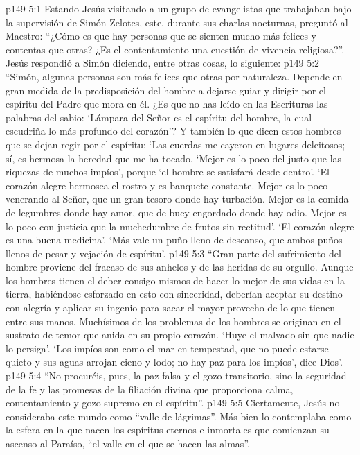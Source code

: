 \vs p149 5:1 Estando Jesús visitando a un grupo de evangelistas que trabajaban bajo la supervisión de Simón Zelotes, este, durante sus charlas nocturnas, preguntó al Maestro: “¿Cómo es que hay personas que se sienten mucho más felices y contentas que otras? ¿Es el contentamiento una cuestión de vivencia religiosa?”. Jesús respondió a Simón diciendo, entre otras cosas, lo siguiente:
\vs p149 5:2 \pc “Simón, algunas personas son más felices que otras por naturaleza. Depende en gran medida de la predisposición del hombre a dejarse guiar y dirigir por el espíritu del Padre que mora en él. ¿Es que no has leído en las Escrituras las palabras del sabio: ‘Lámpara del Señor es el espíritu del hombre, la cual escudriña lo más profundo del corazón’? Y también lo que dicen estos hombres que se dejan regir por el espíritu: ‘Las cuerdas me cayeron en lugares deleitosos; sí, es hermosa la heredad que me ha tocado. ‘Mejor es lo poco del justo que las riquezas de muchos impíos’, porque ‘el hombre se satisfará desde dentro’. ‘El corazón alegre hermosea el rostro y es banquete constante. Mejor es lo poco venerando al Señor, que un gran tesoro donde hay turbación. Mejor es la comida de legumbres donde hay amor, que de buey engordado donde hay odio. Mejor es lo poco con justicia que la muchedumbre de frutos sin rectitud’. ‘El corazón alegre es una buena medicina’. ‘Más vale un puño lleno de descanso, que ambos puños llenos de pesar y vejación de espíritu’.
\vs p149 5:3 “Gran parte del sufrimiento del hombre proviene del fracaso de sus anhelos y de las heridas de su orgullo. Aunque los hombres tienen el deber consigo mismos de hacer lo mejor de sus vidas en la tierra, habiéndose esforzado en esto con sinceridad, deberían aceptar su destino con alegría y aplicar su ingenio para sacar el mayor provecho de lo que tienen entre sus manos. Muchísimos de los problemas de los hombres se originan en el sustrato de temor que anida en su propio corazón. ‘Huye el malvado sin que nadie lo persiga’. ‘Los impíos son como el mar en tempestad, que no puede estarse quieto y sus aguas arrojan cieno y lodo; no hay paz para los impíos’, dice Dios’.
\vs p149 5:4 “No procuréis, pues, la paz falsa y el gozo transitorio, sino la seguridad de la fe y las promesas de la filiación divina que proporciona calma, contentamiento y gozo supremo en el espíritu”.
\vs p149 5:5 \pc Ciertamente, Jesús no consideraba este mundo como “valle de lágrimas”. Más bien lo contemplaba como la esfera en la que nacen los espíritus eternos e inmortales que comienzan su ascenso al Paraíso, “el valle en el que se hacen las almas”.
